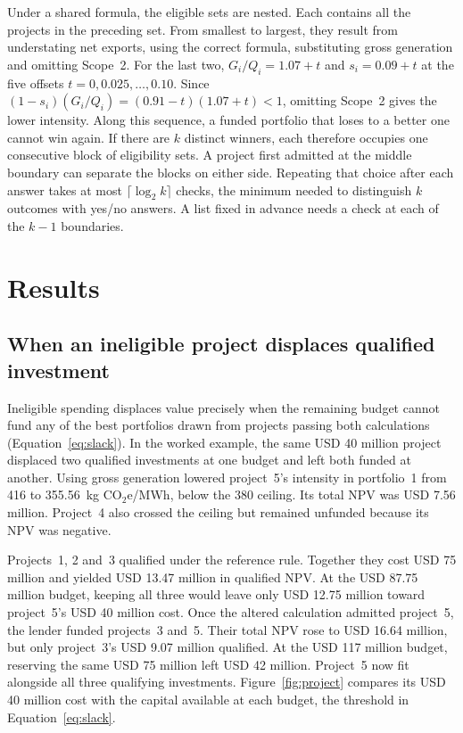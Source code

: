 \documentclass[ijfs,article,submit,oneauthor]{Definitions/mdpi}
\newcommand{\unit}{kg CO$_2$e/MWh}
\begin{document}
Under a shared formula, the eligible sets are nested. Each contains all the projects in the preceding set. From smallest to largest, they result from understating net exports, using the correct formula, substituting gross generation and omitting Scope~2. For the last two, $G_i/Q_i=1.07+t$ and $s_i=0.09+t$ at the five offsets $t=0,0.025,\ldots,0.10$. Since $(1-s_i)(G_i/Q_i)=(0.91-t)(1.07+t)<1$, omitting Scope~2 gives the lower intensity. Along this sequence, a funded portfolio that loses to a better one cannot win again. If there are $k$ distinct winners, each therefore occupies one consecutive block of eligibility sets. A project first admitted at the middle boundary can separate the blocks on either side. Repeating that choice after each answer takes at most $\lceil\log_2 k\rceil$ checks, the minimum needed to distinguish $k$ outcomes with yes/no answers. A list fixed in advance needs a check at each of the $k-1$ boundaries.

\section{Results}
\subsection{When an ineligible project displaces qualified investment}
Ineligible spending displaces value precisely when the remaining budget cannot fund any of the best portfolios drawn from projects passing both calculations (Equation~\eqref{eq:slack}). In the worked example, the same USD 40 million project displaced two qualified investments at one budget and left both funded at another. Using gross generation lowered project~5's intensity in portfolio~1 from 416 to 355.56~\unit, below the 380 ceiling. Its total NPV was USD 7.56 million. Project~4 also crossed the ceiling but remained unfunded because its NPV was negative.

Projects~1, 2 and~3 qualified under the reference rule. Together they cost USD 75 million and yielded USD 13.47 million in qualified NPV. At the USD 87.75 million budget, keeping all three would leave only USD 12.75 million toward project~5's USD 40 million cost. Once the altered calculation admitted project~5, the lender funded projects~3 and~5. Their total NPV rose to USD 16.64 million, but only project~3's USD 9.07 million qualified. At the USD 117 million budget, reserving the same USD 75 million left USD 42 million. Project~5 now fit alongside all three qualifying investments. Figure~\ref{fig:project} compares its USD 40 million cost with the capital available at each budget, the threshold in Equation~\eqref{eq:slack}.
\end{document}
